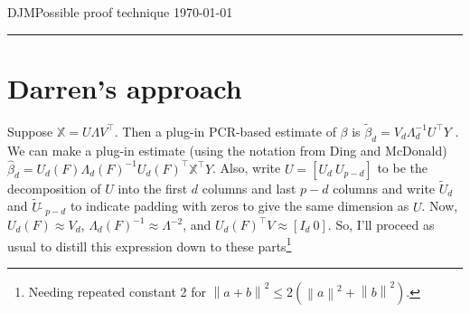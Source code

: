 \documentclass[11pt]{article}
\newcommand{\norm}[1]{\left\lVert #1 \right\rVert}
\newcommand{\X}{\mathbb{X}}
\begin{document}
\begin{center}
\noindent
DJM\hfill Possible proof technique \hfill \today \\
\rule{6.5in}{1pt}
\end{center}

\section{Darren's approach}
Suppose $\X = UΛV^\top$. Then a plug-in PCR-based estimate of $\beta$
is $\tilde\beta_d= V_d\Lambda_d^{-1}U^\top Y$ .
We can make a plug-in estimate (using the notation from Ding and
McDonald) $\hat\beta_d= U_d(F )\Lambda_d(F )^{-1}U_d(F )^\top \X^\top
Y$.  Also, write $U = [U_d\ U_{p-d}]$ to be the decomposition of $U$
into the first $d$ columns and last $p-d$ 
columns and write $\tilde{U}_d$ and $\tilde{U}_{̃p-d}$ to indicate
padding with zeros to give the same dimension as $U$. 
Now, $U_d(F ) \approx V_d$, $\Lambda_d(F )^{-1} \approx \Lambda^{-2}$,
and $U_d(F )^\top V \approx  [I_d\ 0]$. So, I’ll proceed as usual to distill this
 expression down to these parts\footnote{Needing repeated constant 2
   for $\norm{a + b}^2 \leq 2(\norm{a}^2 + \norm{b}^2)$.} 
\end{document}
